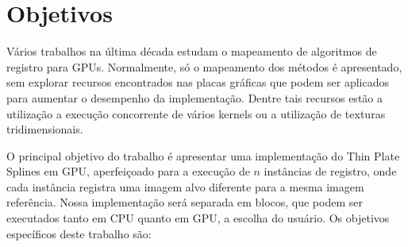 %
%

\section{Objetivos}

  Vários trabalhos na última década estudam o mapeamento de algoritmos de
registro para GPUs. Normalmente, só o mapeamento dos métodos é apresentado, sem
explorar recursos encontrados nas placas gráficas que podem ser aplicados para
aumentar o desempenho da implementação. Dentre tais recursos estão a utilização
a execução concorrente de vários kernels ou a utilização de texturas
tridimensionais.

  O principal objetivo do trabalho é apresentar uma implementação do Thin Plate
Splines em GPU, aperfeiçoado para a execução de $n$ instâncias de registro, onde
cada instância registra uma imagem alvo diferente para a mesma imagem referência.
Nossa implementação será separada em blocos, que podem ser executados tanto em
CPU quanto em GPU, a escolha do usuário. Os objetivos específicos deste
trabalho são:


